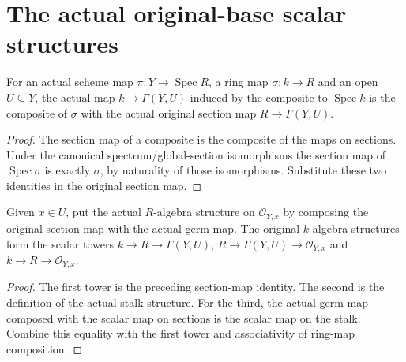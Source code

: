 \section{The actual original-base scalar structures}

\begin{lemma}\label{lem:sc0-resolution-section-base-composition}
\leanok
For an actual scheme map $\pi:Y\to\operatorname{Spec}R$, a ring map
$\sigma:k\to R$ and an open $U\subseteq Y$, the actual map
$k\to\Gamma(Y,U)$ induced by the composite to $\operatorname{Spec}k$ is the
composite of $\sigma$ with the actual original section map $R\to\Gamma(Y,U)$.
\end{lemma}
\begin{proof}
The section map of a composite is the composite of the maps on sections. Under
the canonical spectrum/global-section isomorphisms the section map of
$\operatorname{Spec}\sigma$ is exactly $\sigma$, by naturality of those
isomorphisms. Substitute these two identities in the original section map.
\end{proof}

\begin{lemma}\label{lem:sc0-resolution-stalk-scalar-towers}
\leanok
{}
Given $x\in U$, put the actual $R$-algebra structure on $\mathcal O_{Y,x}$ by
composing the original section map with the actual germ map. The original
$k$-algebra structures form the scalar towers
$k\to R\to\Gamma(Y,U)$, $R\to\Gamma(Y,U)\to\mathcal O_{Y,x}$ and
$k\to R\to\mathcal O_{Y,x}$.
\end{lemma}
\begin{proof}
The first tower is the preceding section-map identity. The second is the
definition of the actual stalk structure. For the third, the actual germ map
composed with the scalar map on sections is the scalar map on the stalk.
Combine this equality with the first tower and associativity of ring-map
composition.
\end{proof}
